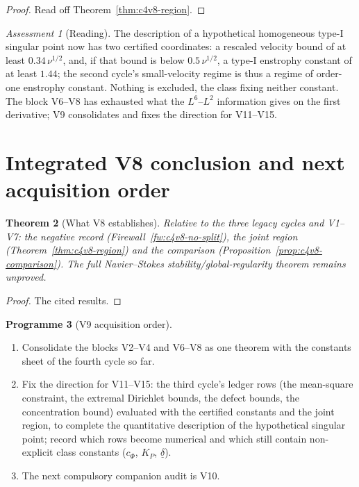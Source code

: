 \documentclass[11pt]{article}
\theoremstyle{plain}
\newtheorem{theorem}{Theorem}[section]
\theoremstyle{definition}
\newtheorem{programme}[theorem]{Programme}
\theoremstyle{remark}
\newtheorem{assessment}[theorem]{Assessment}
\begin{document}
\begin{proof}
Read off Theorem~\ref{thm:c4v8-region}.
\end{proof}

\begin{assessment}[Reading]
\label{ass:c4v8-reading}
The description of a hypothetical homogeneous type-I singular point
now has two certified coordinates: a rescaled velocity bound of at
least \(0.34\,\nu^{1/2}\), and, if that bound is below \(0.5\,\nu^{1/2}\), a type-I enstrophy
constant of at least \(1.44\); the second cycle's small-velocity regime
is thus a regime of order-one enstrophy constant.  Nothing is
excluded, the class fixing neither constant.  The block V6--V8 has
exhausted what the \(L^6\)--\(L^2\) information gives on the first derivative;
V9 consolidates and fixes the direction for V11--V15.
\end{assessment}

\section{Integrated V8 conclusion and next acquisition order}
\label{sec:c4v8-conclusion}

\begin{theorem}[What V8 establishes]
\label{thm:c4v8-conclusion}
Relative to the three legacy cycles and V1--V7: the negative record
(Firewall~\ref{fw:c4v8-no-split}), the joint region
(Theorem~\ref{thm:c4v8-region}) and the comparison
(Proposition~\ref{prop:c4v8-comparison}).  The full Navier--Stokes
stability/global-regularity theorem remains unproved.
\end{theorem}

\begin{proof}
The cited results.
\end{proof}

\begin{programme}[V9 acquisition order]
\label{prog:c4v9}
\begin{enumerate}[label=\textup{(AC\arabic*)},leftmargin=4.8em]
\item Consolidate the blocks V2--V4 and V6--V8 as one theorem with the
      constants sheet of the fourth cycle so far.
\item Fix the direction for V11--V15: the third cycle's ledger rows
      (the mean-square constraint, the extremal Dirichlet bounds, the
      defect bounds, the concentration bound) evaluated with the
      certified constants and the joint region, to complete the
      quantitative description of the hypothetical singular point;
      record which rows become numerical and which still contain
      non-explicit class constants (\(c_\Phi\), \(K_P\), \(\underline\delta\)).
\item The next compulsory companion audit is V10.
\end{enumerate}
\end{programme}
\end{document}
